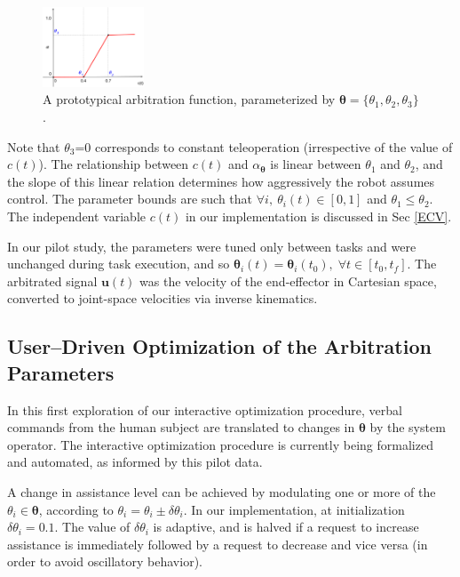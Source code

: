 \documentclass[letterpaper, 10 pt, journal, twoside]{IEEEtran}  %
\begin{document}
	\begin{figure}
		\begin{center}
			\vspace{-.6cm}
			\includegraphics[width=0.27\textwidth]{./finalfigures/Figure2.eps}
		\end{center}
		\vspace{-.45cm}
		\caption{A prototypical arbitration function, parameterized by {\footnotesize $\boldsymbol{\theta} = \{\theta_{1}, \theta_{2}, \theta_{3}\}$}.}
		\label{PAF}
	\end{figure}
	Note that $\theta_{3}$\;=\;$0$ corresponds to constant teleoperation (irrespective of the value of $c(t)$). The relationship between $c(t)$ and $\alpha_{\boldsymbol{\theta}}$ is linear between $\theta_{1}$ and $\theta_{2}$, and the slope of this linear relation determines how aggressively the robot assumes control.
	The parameter bounds are such that $\forall i,~ \theta_{i}(t) \in [0,1]$ and $\theta_{1} \leq \theta_{2}$.
	The independent variable $c(t)$ in our implementation is discussed in Sec \ref{ECV}. 
	
	In our pilot study, the parameters were tuned only between tasks and were unchanged during task execution, and so $\boldsymbol{\theta}_{i}(t) = \boldsymbol{\theta}_{i}(t_{0}),\; \forall t \in [t_{0}, t_{f}]$.
	The arbitrated signal $\boldsymbol{u}(t)$ was the velocity of the end-effector in Cartesian space, converted to joint-space velocities via inverse kinematics.
	\subsection{User--Driven Optimization of the Arbitration Parameters} \label{UDOAP}
	
	In this first exploration of our interactive optimization
	procedure, verbal commands from the human subject are translated to changes in $\boldsymbol{\theta}$ by the system operator. The interactive optimization procedure is currently being formalized and automated, as informed by this pilot data. 
	
	A change in assistance level can be achieved by modulating one or more of the $\theta_{i} \in \boldsymbol{\theta}$, according to
	$\theta_{i} = \theta_{i} \pm \delta\theta_{i}$.
	In our implementation, at initialization $\delta\theta_{i} =
	0.1$.
	The value of $\delta\theta_{i}$ is adaptive, and is halved if a request to increase assistance is immediately followed by a request to decrease and vice versa (in order to avoid oscillatory behavior). 
	
\end{document}
